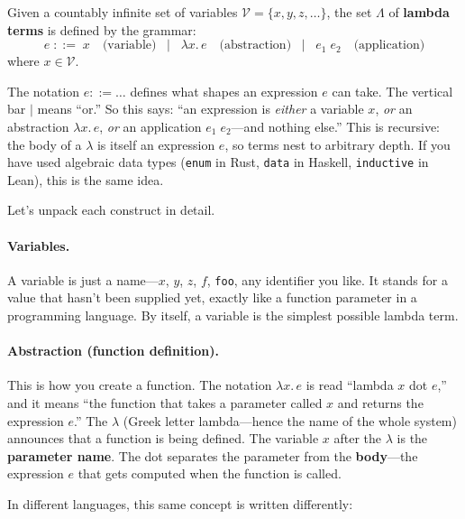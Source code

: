 \documentclass[11pt,a4paper]{article}
\theoremstyle{definition}
\newcommand{\lam}{\lambda}
\begin{document}
\begin{defnbox}
Given a countably infinite set of variables
$\mathcal{V} = \{x, y, z, \ldots\}$, the set $\Lambda$ of
\textbf{lambda terms} is defined by the grammar:
\[
  e \;::=\;
    x                              \quad\text{(variable)}
  \;\;\mid\;\; \lam x.\, e            \quad\text{(abstraction)}
  \;\;\mid\;\; e_1\; e_2              \quad\text{(application)}
\]
where $x \in \mathcal{V}$.
\end{defnbox}

\begin{intuition}
The notation $e ::= \ldots$ defines what shapes an expression $e$ can take.
The vertical bar $\mid$ means ``or.'' So this says: ``an expression is
\emph{either} a variable $x$, \emph{or} an abstraction $\lam x.\, e$,
\emph{or} an application $e_1\; e_2$---and nothing else.'' This is recursive:
the body of a $\lam$ is itself an expression $e$, so terms nest to arbitrary
depth. If you have used algebraic data types (\texttt{enum} in Rust,
\texttt{data} in Haskell, \texttt{inductive} in Lean), this is the same idea.
\end{intuition}

Let's unpack each construct in detail.

\paragraph{Variables.} A variable is just a name---$x$, $y$, $z$, $f$,
\texttt{foo}, any identifier you like. It stands for a value that hasn't been
supplied yet, exactly like a function parameter in a programming language. By
itself, a variable is the simplest possible lambda term.

\paragraph{Abstraction (function definition).} This is how you create a
function. The notation $\lam x.\, e$ is read ``lambda $x$ dot $e$,'' and it
means ``the function that takes a parameter called $x$ and returns the
expression $e$.'' The $\lam$ (Greek letter lambda---hence the name of the
whole system) announces that a function is being defined. The variable $x$
after the $\lam$ is the \textbf{parameter name}. The dot separates the
parameter from the \textbf{body}---the expression $e$ that gets computed when
the function is called.

In different languages, this same concept is written differently:
\end{document}
